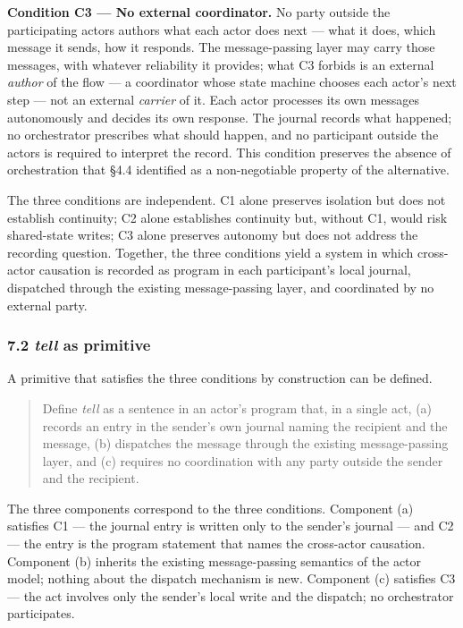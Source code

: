 \documentclass[
]{article}
\begin{document}
\textbf{Condition C3 --- No external coordinator.} No party outside the
participating actors authors what each actor does next --- what it does,
which message it sends, how it responds. The message-passing layer may
carry those messages, with whatever reliability it provides; what C3
forbids is an external \emph{author} of the flow --- a coordinator whose
state machine chooses each actor's next step --- not an external
\emph{carrier} of it. Each actor processes its own messages autonomously
and decides its own response. The journal records what happened; no
orchestrator prescribes what should happen, and no participant outside
the actors is required to interpret the record. This condition preserves
the absence of orchestration that §4.4 identified as a non-negotiable
property of the alternative.

The three conditions are independent. C1 alone preserves isolation but
does not establish continuity; C2 alone establishes continuity but,
without C1, would risk shared-state writes; C3 alone preserves autonomy
but does not address the recording question. Together, the three
conditions yield a system in which cross-actor causation is recorded as
program in each participant's local journal, dispatched through the
existing message-passing layer, and coordinated by no external party.

\subsubsection{\texorpdfstring{7.2 \emph{tell} as
primitive}{7.2 tell as primitive}}\label{tell-as-primitive}

A primitive that satisfies the three conditions by construction can be
defined.

\begin{quote}
Define \emph{tell} as a sentence in an actor's program that, in a single
act, (a) records an entry in the sender's own journal naming the
recipient and the message, (b) dispatches the message through the
existing message-passing layer, and (c) requires no coordination with
any party outside the sender and the recipient.
\end{quote}

The three components correspond to the three conditions. Component (a)
satisfies C1 --- the journal entry is written only to the sender's
journal --- and C2 --- the entry is the program statement that names the
cross-actor causation. Component (b) inherits the existing
message-passing semantics of the actor model; nothing about the dispatch
mechanism is new. Component (c) satisfies C3 --- the act involves only
the sender's local write and the dispatch; no orchestrator participates.
\end{document}
